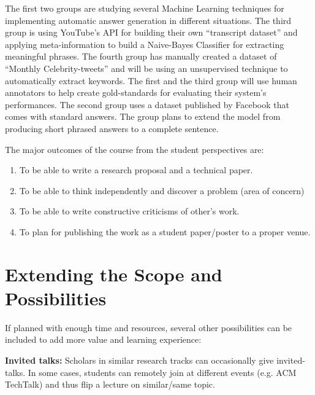 \documentclass{article}
\begin{document}
\par The first two groups are studying several Machine Learning techniques for implementing automatic answer generation in different situations. The third group is using YouTube's API for building their own ``transcript dataset'' and applying meta-information to build a Naive-Bayes Classifier for extracting meaningful phrases. The fourth group has manually created a dataset of ``Monthly Celebrity-tweets'' and will be using an unsupervised technique to automatically extract keywords. The first and the third group will use human annotators to help create gold-standards for evaluating their system's performances. The second group uses a dataset published by Facebook that comes with standard answers. The group plans to extend the model from producing short phrased answers to a complete sentence. 
\par The major outcomes of the course from the student perspectives are: 
\begin{enumerate}[label=(\alph*), noitemsep, nolistsep]
\item To be able to write a research proposal and a technical paper.
\item To be able to think independently and discover a problem (area of concern) 
\item To be able to write constructive criticisms of other's work.
\item To plan for publishing the work as a student paper/poster to a proper venue.  
\end{enumerate}
\section{Extending the Scope and Possibilities}
\label{extension}
If planned with enough time and resources, several other possibilities can be included to add more value and learning experience:\\

\par {\bf Invited talks: } Scholars in similar research tracks can occasionally give invited-talks. In some cases, students can remotely join at different events (e.g. ACM TechTalk) and thus flip a lecture on similar/same topic.
\end{document}

